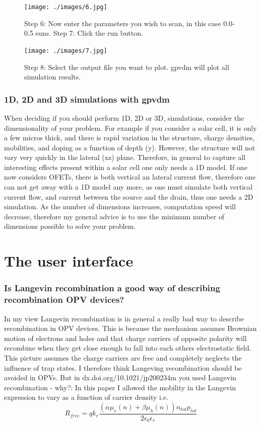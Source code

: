 \begin{figure}[ht!]
\centering
\texttt{[image: ./images/6.jpg]}
\caption*{Step 6: Now enter the parameters you wish to scan, in this case 0.0-0.5 suns.
Step 7: Click the run button.}
\end{figure}


\begin{figure}[ht!]
\centering
\texttt{[image: ./images/7.jpg]}
\caption*{Step 8: Select the output file you want to plot.  gpvdm will plot all simulation results.}
\end{figure}

\subsubsection{1D, 2D and 3D simulations with gpvdm}
When deciding if you should perform 1D, 2D or 3D, simulations, consider the dimensionality of your problem.  For example if you consider a solar cell, it is only a few micros thick, and there is rapid variation in the structure, charge densities, mobilities, and doping as a function of depth (y).  However, the structure will not vary very quickly in the lateral (xz) plane.  Therefore, in general  to capture all interesting effects present within a solar cell one only needs a 1D model.  If one now considers OFETs, there is both vertical an lateral current flow, therefore one can not get away with a 1D model any more, as one must simulate both vertical current flow, and current between the source and the drain, thus one needs a 2D simulation.  As the number of dimensions increases, computation speed will decrease, therefore my general advice is to use the minimum number of dimensions possible to solve your problem.




\newpage




\section{The user interface}
\subsubsection{Is Langevin recombination a good way of describing recombination OPV devices?}
In my view Langevin recombination is in general a really bad way to describe recombination in OPV devices.  This is because the mechanism assumes Brownian motion of electrons and holes and that charge carriers of opposite polarity will recombine when they get close enough to fall into each others electrostatic field.  This picture assumes the charge carriers are free and completely neglects the influence of trap states.  I therefore think Langeving recombination should be avoided in OPVs.
But in dx.doi.org/10.1021/jp200234m you used Langevin recombination - why?: In this paper I allowed the mobility in the Langevin expression to vary as a function of carrier density i.e.
\begin{equation}
R_{free}=q k_{r}\frac{(\alpha \mu_e(n)+\beta \mu_h(n)) n_{tot} p_{tot}}{2\epsilon_0\epsilon_r}
\end{equation}

